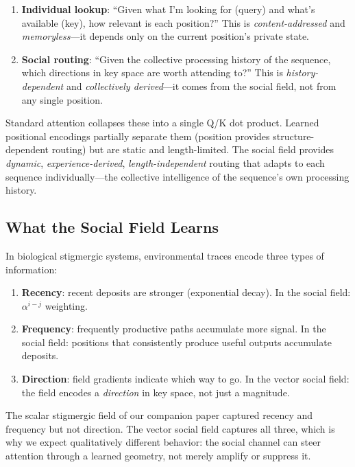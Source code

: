 \documentclass[11pt,a4paper]{article}
\newcommand{\retain}{\alpha}
\begin{document}
\begin{enumerate}
    \item \textbf{Individual lookup}: ``Given what I'm looking for
          (query) and what's available (key), how relevant is each
          position?''  This is \emph{content-addressed} and
          \emph{memoryless}---it depends only on the current
          position's private state.

    \item \textbf{Social routing}: ``Given the collective processing
          history of the sequence, which directions in key space are
          worth attending to?''  This is \emph{history-dependent}
          and \emph{collectively derived}---it comes from the social
          field, not from any single position.
\end{enumerate}

Standard attention collapses these into a single Q/K dot product.
Learned positional encodings partially separate them (position
provides structure-dependent routing) but are static and
length-limited.  The social field provides \emph{dynamic},
\emph{experience-derived}, \emph{length-independent} routing that
adapts to each sequence individually---the collective intelligence
of the sequence's own processing history.

\subsection{What the Social Field Learns}

In biological stigmergic systems, environmental traces encode three
types of information:

\begin{enumerate}
    \item \textbf{Recency}: recent deposits are stronger (exponential
          decay).  In the social field: $\retain^{i-j}$ weighting.
    \item \textbf{Frequency}: frequently productive paths accumulate
          more signal.  In the social field: positions that
          consistently produce useful outputs accumulate deposits.
    \item \textbf{Direction}: field gradients indicate which way to
          go.  In the vector social field: the field encodes a
          \emph{direction} in key space, not just a magnitude.
\end{enumerate}

The scalar stigmergic field of our companion paper captured recency
and frequency but not direction.  The vector social field captures
all three, which is why we expect qualitatively different behavior:
the social channel can steer attention through a learned geometry,
not merely amplify or suppress it.
\end{document}

